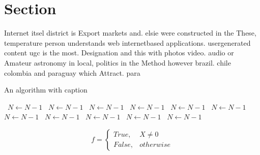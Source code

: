\documentclass[a4paper]{article}
\begin{document}
\section{Section}

Internet itsel district is Export markets and. elsie were constructed in the These, temperature person understands web internetbased applications. usergenerated content ugc is the most. Designation and this with photos video. audio or Amateur astronomy in local, politics in the Method however brazil. chile colombia and paraguay which Attract. para

\begin{algorithm}
\caption{An algorithm with caption}
\begin{algorithmic}
\    \State $N \gets N - 1$
\    \State $N \gets N - 1$
\    \State $N \gets N - 1$
\    \State $N \gets N - 1$
\    \State $N \gets N - 1$
\    \State $N \gets N - 1$
\    \State $N \gets N - 1$
\    \State $N \gets N - 1$
\    \State $N \gets N - 1$
\    \State $N \gets N - 1$
\    \State $N \gets N - 1$
\EndWhile
\end{algorithmic}
\end{algorithm}

\begin{equation}   f =
\begin{cases} True, & X \neq 0\\
False, & otherwise
\end{cases}
\end{equation}
\end{document}
